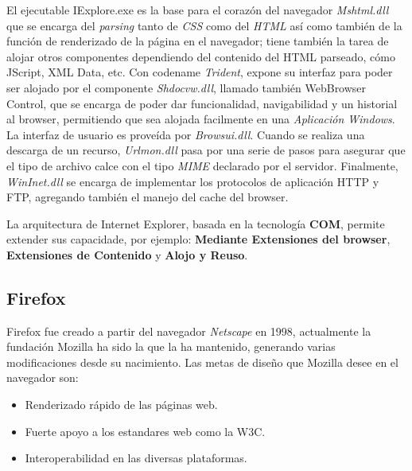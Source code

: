    El ejecutable IExplore.exe es la base para el corazón del navegador \textit{Mshtml.dll} que se encarga del \textit{parsing} tanto de \textit{CSS} como del \textit{HTML} así como también de la función de renderizado de la página en el navegador; tiene también la tarea de alojar otros componentes dependiendo del contenido del HTML parseado, cómo JScript, XML Data, etc. Con codename \textit{Trident}, expone su interfaz para poder ser alojado por el componente \textit{Shdocvw.dll}, llamado también WebBrowser Control, que se encarga de poder dar funcionalidad, navigabilidad y un historial al browser, permitiendo que sea alojada facilmente en una \textit{Aplicación Windows}. La interfaz de usuario es proveída por \textit{Browsui.dll}. Cuando se realiza una descarga de un recurso, \textit{Urlmon.dll} pasa por una serie de pasos para asegurar que el tipo de archivo calce con el tipo \textit{MIME} declarado por el servidor. Finalmente, \textit{WinInet.dll} se encarga de implementar los protocolos de aplicación HTTP y FTP, agregando también el manejo del cache del browser.
            
    La arquitectura de Internet Explorer, basada en la tecnología \textbf{COM}, permite extender sus capacidade, por ejemplo: \textbf{Mediante Extensiones del browser}, \textbf{Extensiones de Contenido} y \textbf{Alojo y Reuso}.


    \subsection{Firefox}
    \label{chap3:Firefox}

    Firefox fue creado a partir del navegador \textit{Netscape} en 1998, actualmente la fundación Mozilla ha sido la que la ha mantenido, generando varias modificaciones desde su nacimiento. Las metas de diseño que Mozilla desee en el navegador son:
    \begin{itemize}
        \item Renderizado rápido de las páginas web.
        \item Fuerte apoyo a los estandares web como la W3C.
        \item Interoperabilidad en las diversas plataformas.
    \end{itemize}


